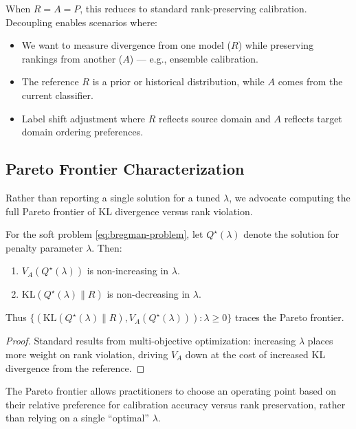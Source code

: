 When $R = A = P$, this reduces to standard rank-preserving calibration.
Decoupling enables scenarios where:
\begin{itemize}
\item We want to measure divergence from one model ($R$) while preserving
      rankings from another ($A$) --- e.g., ensemble calibration.
\item The reference $R$ is a prior or historical distribution, while $A$
      comes from the current classifier.
\item Label shift adjustment where $R$ reflects source domain and $A$
      reflects target domain ordering preferences.
\end{itemize}


\subsection{Pareto Frontier Characterization}

Rather than reporting a single solution for a tuned $\lambda$, we advocate
computing the full Pareto frontier of KL divergence versus rank violation.

\begin{proposition}
For the soft problem \eqref{eq:bregman-problem}, let $Q^\star(\lambda)$ denote
the solution for penalty parameter $\lambda$. Then:
\begin{enumerate}
\item $V_A(Q^\star(\lambda))$ is non-increasing in $\lambda$.
\item $\text{KL}(Q^\star(\lambda) \| R)$ is non-decreasing in $\lambda$.
\end{enumerate}
Thus $\{(\text{KL}(Q^\star(\lambda)\|R), V_A(Q^\star(\lambda))) : \lambda \geq 0\}$
traces the Pareto frontier.
\end{proposition}

\begin{proof}
Standard results from multi-objective optimization: increasing $\lambda$
places more weight on rank violation, driving $V_A$ down at the cost of
increased KL divergence from the reference.
\end{proof}

The Pareto frontier allows practitioners to choose an operating point based on
their relative preference for calibration accuracy versus rank preservation,
rather than relying on a single ``optimal'' $\lambda$.
